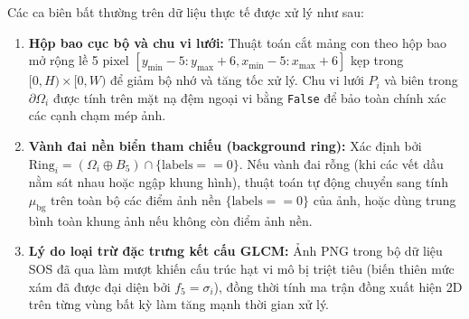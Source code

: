 Các ca biên bất thường trên dữ liệu thực tế được xử lý như sau:
\begin{enumerate}
    \item \textbf{Hộp bao cục bộ và chu vi lưới:} Thuật toán cắt mảng con theo hộp bao mở rộng lề 5 pixel $[y_{\min}-5 : y_{\max}+6, x_{\min}-5 : x_{\max}+6]$ kẹp trong $[0, H) \times [0, W)$ để giảm bộ nhớ và tăng tốc xử lý. Chu vi lưới $P_i$ và biên trong $\partial \Omega_i$ được tính trên mặt nạ đệm ngoại vi bằng \texttt{False} để bảo toàn chính xác các cạnh chạm mép ảnh.
    \item \textbf{Vành đai nền biển tham chiếu (background ring):} Xác định bởi $\mathrm{Ring}_i = (\Omega_i \oplus B_5) \cap \{ \text{labels} == 0 \}$. Nếu vành đai rỗng (khi các vết dầu nằm sát nhau hoặc ngập khung hình), thuật toán tự động chuyển sang tính $\mu_{\mathrm{bg}}$ trên toàn bộ các điểm ảnh nền $\{ \text{labels} == 0 \}$ của ảnh, hoặc dùng trung bình toàn khung ảnh nếu không còn điểm ảnh nền.
    \item \textbf{Lý do loại trừ đặc trưng kết cấu GLCM:} Ảnh PNG trong bộ dữ liệu SOS đã qua làm mượt khiến cấu trúc hạt vi mô bị triệt tiêu (biến thiên mức xám đã được đại diện bởi $f_5 = \sigma_i$), đồng thời tính ma trận đồng xuất hiện 2D trên từng vùng bất kỳ làm tăng mạnh thời gian xử lý.
\end{enumerate}
